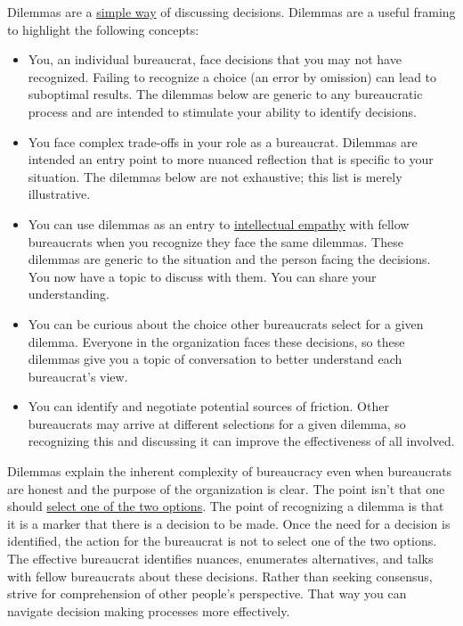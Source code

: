 Dilemmas are a \href{https://en.wikipedia.org/wiki/Defeasible_reasoning}{simple way}
of discussing decisions. %
Dilemmas are a useful framing to highlight the following concepts:
\begin{itemize}
    \item You, an individual bureaucrat, face decisions that you may not have recognized. Failing to recognize a choice (an error by omission) can lead to suboptimal results. The dilemmas below are generic to any bureaucratic process and are intended to stimulate your ability to identify decisions. 
    \item You face complex trade-offs in your role as a bureaucrat. Dilemmas are intended an entry point to more nuanced reflection that is specific to your situation. The dilemmas below are not exhaustive; this list is merely illustrative. 
    \item You can use dilemmas as an entry to \href{https://en.wikipedia.org/wiki/Theory_of_mind}{intellectual empathy} 
    with fellow bureaucrats when you recognize they face the same dilemmas. These dilemmas are generic to the situation and the person facing the decisions. You now have a topic to discuss with them. You can share your understanding. 
    \item You can be curious about the choice other bureaucrats select for a given dilemma. Everyone in the organization faces these decisions, so these dilemmas give you a topic of conversation to better understand each bureaucrat's view.
    \item You can identify and negotiate potential sources of friction. Other bureaucrats may arrive at different selections for a given dilemma, so recognizing this and discussing it can improve the effectiveness of all involved.
\end{itemize}


Dilemmas explain the inherent complexity of bureaucracy even when bureaucrats are honest and the purpose of the organization is clear.
The point isn't that one should \href{https://en.wikipedia.org/wiki/False_dilemma}{select one of the two options}. 
The point of recognizing a dilemma is that it is a marker that there is a decision to be made.
Once the need for a decision is identified, the action for the bureaucrat is not to select one of the two options. The effective bureaucrat identifies nuances, enumerates alternatives, and talks with fellow bureaucrats about these decisions. Rather than seeking consensus, strive for comprehension of other people's perspective. That way you can navigate decision making processes more effectively.

